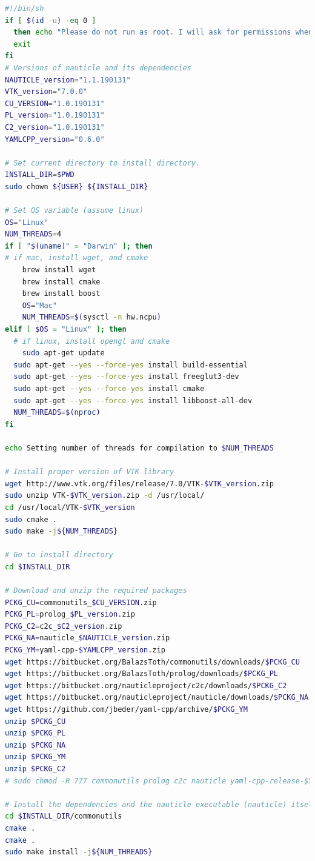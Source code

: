 \documentclass[a4paper,12pt,openany]{book}
\theoremstyle{break}
\begin{document}
\begin{example}{\installer{}}{}
\lstset{basicstyle=\tiny}
\begin{lstlisting}[language=bash]
#!/bin/sh
if [ $(id -u) -eq 0 ]
  then echo "Please do not run as root. I will ask for permissions when necessary."
  exit
fi
# Versions of nauticle and its dependencies
NAUTICLE_version="1.1.190131"
VTK_version="7.0.0"
CU_VERSION="1.0.190131"
PL_version="1.0.190131"
C2_version="1.0.190131"
YAMLCPP_version="0.6.0"

# Set current directory to install directory.
INSTALL_DIR=$PWD
sudo chown ${USER} ${INSTALL_DIR}

# Set OS variable (assume linux)
OS="Linux"
NUM_THREADS=4
if [ "$(uname)" = "Darwin" ]; then
# if mac, install wget, and cmake
    brew install wget
    brew install cmake
    brew install boost
    OS="Mac"
    NUM_THREADS=$(sysctl -n hw.ncpu)
elif [ $OS = "Linux" ]; then
  # if linux, install opengl and cmake
    sudo apt-get update
  sudo apt-get --yes --force-yes install build-essential
  sudo apt-get --yes --force-yes install freeglut3-dev
  sudo apt-get --yes --force-yes install cmake
  sudo apt-get --yes --force-yes install libboost-all-dev
  NUM_THREADS=$(nproc)
fi

echo Setting number of threads for compilation to $NUM_THREADS

# Install proper version of VTK library
wget http://www.vtk.org/files/release/7.0/VTK-$VTK_version.zip
sudo unzip VTK-$VTK_version.zip -d /usr/local/
cd /usr/local/VTK-$VTK_version
sudo cmake .
sudo make -j${NUM_THREADS}

# Go to install directory
cd $INSTALL_DIR

# Download and unzip the required packages
PCKG_CU=commonutils_$CU_VERSION.zip
PCKG_PL=prolog_$PL_version.zip
PCKG_C2=c2c_$C2_version.zip
PCKG_NA=nauticle_$NAUTICLE_version.zip
PCKG_YM=yaml-cpp-$YAMLCPP_version.zip
wget https://bitbucket.org/BalazsToth/commonutils/downloads/$PCKG_CU
wget https://bitbucket.org/BalazsToth/prolog/downloads/$PCKG_PL
wget https://bitbucket.org/nauticleproject/c2c/downloads/$PCKG_C2
wget https://bitbucket.org/nauticleproject/nauticle/downloads/$PCKG_NA
wget https://github.com/jbeder/yaml-cpp/archive/$PCKG_YM
unzip $PCKG_CU
unzip $PCKG_PL
unzip $PCKG_NA
unzip $PCKG_YM
unzip $PCKG_C2
# sudo chmod -R 777 commonutils prolog c2c nauticle yaml-cpp-release-$YAMLCPP_version

# Install the dependencies and the nauticle executable (nauticle) itself
cd $INSTALL_DIR/commonutils
cmake .
cmake .
sudo make install -j${NUM_THREADS}
 

\end{lstlisting}
\end{example}
\end{document}
